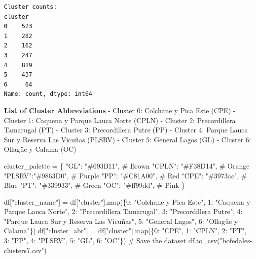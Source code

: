 \documentclass[
  letterpaper,
  DIV=11,
  numbers=noendperiod]{scrreprt}
\newenvironment{Shaded}{\begin{snugshade}}{\end{snugshade}}
\newcommand{\BuiltInTok}[1]{\textcolor[rgb]{0.00,0.23,0.31}{#1}}
\newcommand{\CommentTok}[1]{\textcolor[rgb]{0.37,0.37,0.37}{#1}}
\newcommand{\DecValTok}[1]{\textcolor[rgb]{0.68,0.00,0.00}{#1}}
\newcommand{\NormalTok}[1]{\textcolor[rgb]{0.00,0.23,0.31}{#1}}
\newcommand{\OperatorTok}[1]{\textcolor[rgb]{0.37,0.37,0.37}{#1}}
\newcommand{\StringTok}[1]{\textcolor[rgb]{0.13,0.47,0.30}{#1}}
\begin{document}
\begin{verbatim}
Cluster counts:
cluster
0    523
1    282
2    162
3    247
4    819
5    437
6     64
Name: count, dtype: int64
\end{verbatim}

\textbf{List of Cluster Abbreviations} - Cluster 0: Colchane y Pica Este
(CPE) - Cluster 1: Caquena y Parque Lauca Norte (CPLN) - Cluster 2:
Precordillera Tamarugal (PT) - Cluster 3: Precordillera Putre (PP) -
Cluster 4: Parque Lauca Sur y Reserva Las Vicuñas (PLSRV) - Cluster 5:
General Lagos (GL) - Cluster 6: Ollagüe y Calama (OC)

\begin{Shaded}
\begin{Highlighting}[]
\NormalTok{cluster\_palette }\OperatorTok{=}\NormalTok{ \{}
    \StringTok{"GL"}\NormalTok{:   }\StringTok{"\#693B11"}\NormalTok{, }\CommentTok{\# Brown}
    \StringTok{"CPLN"}\NormalTok{: }\StringTok{"\#F38D14"}\NormalTok{, }\CommentTok{\# Orange}
    \StringTok{"PLSRV"}\NormalTok{:}\StringTok{"\#9863D0"}\NormalTok{, }\CommentTok{\# Purple}
    \StringTok{"PP"}\NormalTok{:   }\StringTok{"\#C81A00"}\NormalTok{, }\CommentTok{\# Red}
    \StringTok{"CPE"}\NormalTok{:  }\StringTok{"\#3973ac"}\NormalTok{, }\CommentTok{\# Blue}
    \StringTok{"PT"}\NormalTok{:   }\StringTok{"\#339933"}\NormalTok{, }\CommentTok{\# Green}
    \StringTok{"OC"}\NormalTok{:   }\StringTok{"\#ff99dd"}\NormalTok{, }\CommentTok{\# Pink}
\NormalTok{\}}

\NormalTok{df[}\StringTok{"cluster\_name"}\NormalTok{] }\OperatorTok{=}\NormalTok{ df[}\StringTok{"cluster"}\NormalTok{].}\BuiltInTok{map}\NormalTok{(\{}\DecValTok{0}\NormalTok{: }\StringTok{"Colchane y Pica Este"}\NormalTok{, }\DecValTok{1}\NormalTok{: }\StringTok{"Caquena y Parque Lauca Norte"}\NormalTok{, }\DecValTok{2}\NormalTok{: }\StringTok{"Precordillera Tamarugal"}\NormalTok{, }\DecValTok{3}\NormalTok{: }\StringTok{"Precordillera Putre"}\NormalTok{, }\DecValTok{4}\NormalTok{: }\StringTok{"Parque Lauca Sur y Reserva Las Vicuñas"}\NormalTok{, }\DecValTok{5}\NormalTok{: }\StringTok{"General Lagos"}\NormalTok{, }\DecValTok{6}\NormalTok{: }\StringTok{"Ollagüe y Calama"}\NormalTok{\})}
\NormalTok{df[}\StringTok{"cluster\_abr"}\NormalTok{] }\OperatorTok{=}\NormalTok{ df[}\StringTok{"cluster"}\NormalTok{].}\BuiltInTok{map}\NormalTok{(\{}\DecValTok{0}\NormalTok{: }\StringTok{"CPE"}\NormalTok{, }\DecValTok{1}\NormalTok{: }\StringTok{"CPLN"}\NormalTok{, }\DecValTok{2}\NormalTok{: }\StringTok{"PT"}\NormalTok{, }\DecValTok{3}\NormalTok{: }\StringTok{"PP"}\NormalTok{, }\DecValTok{4}\NormalTok{: }\StringTok{"PLSRV"}\NormalTok{, }\DecValTok{5}\NormalTok{: }\StringTok{"GL"}\NormalTok{, }\DecValTok{6}\NormalTok{: }\StringTok{"OC"}\NormalTok{\})}
\CommentTok{\# Save the dataset}
\NormalTok{df.to\_csv(}\StringTok{"bofedales{-}clusters7.csv"}\NormalTok{)}
\end{Highlighting}
\end{Shaded}
\end{document}
